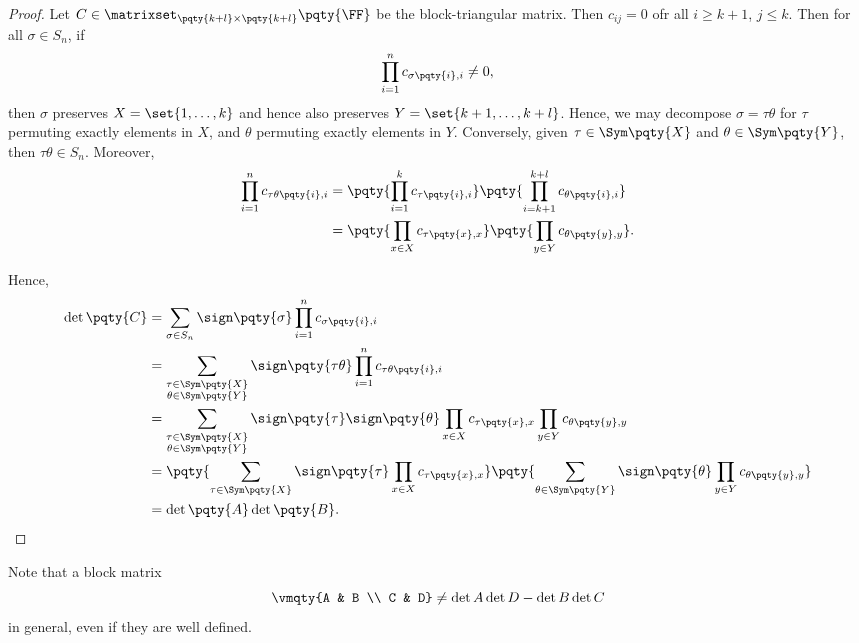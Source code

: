 \begin{proof}
    Let \(C \in \matrixset_{\pqty{k + l} \times \pqty{k + l}} \pqty{\FF}\) be the block-triangular matrix. Then \(c_{ij} = 0\) ofr all \(i \geq k + 1\), \(j \leq k\). Then for all \(\sigma \in S_n\), if
    \[
        \prod_{i = 1}^{n} c_{\sigma\pqty{i}, i} \neq 0,
    \]
    then \(\sigma\) preserves \(X = \set{1, \ldots, k}\) and hence also preserves \(Y = \set{k + 1, \ldots, k + l}\). Hence, we may decompose \(\sigma = \tau \theta\) for \(\tau\) permuting exactly elements in \(X\), and \(\theta\) permuting exactly elements in \(Y\). Conversely, given \(\tau \in \Sym\pqty{X}\) and \(\theta \in \Sym\pqty{Y}\), then \(\tau \theta \in S_n\). Moreover,
    \begin{align*}
        \prod_{i = 1}^{n} c_{\tau \theta\pqty{i}, i} &= \pqty{\prod_{i = 1}^{k} c_{\tau\pqty{i}, i}} \pqty{\prod_{i = k + 1}^{k + l} c_{\theta\pqty{i}, i}} \\
        &= \pqty{\prod_{x \in X} c_{\tau\pqty{x}, x}} \pqty{\prod_{y \in Y} c_{\theta\pqty{y}, y}}.
    \end{align*}

    Hence,
    \begin{align*}
        \det\pqty{C} &= \sum_{\sigma \in S_n} \sign\pqty{\sigma} \prod_{i = 1}^{n} c_{\sigma\pqty{i}, i} \\
        &= \sum_{\substack{\tau \in \Sym\pqty{X} \\ \theta \in \Sym\pqty{Y}}} \sign\pqty{\tau \theta} \prod_{i = 1}^{n} c_{\tau \theta\pqty{i}, i} \\
        &= \sum_{\substack{\tau \in \Sym\pqty{X} \\ \theta \in \Sym\pqty{Y}}} \sign\pqty{\tau} \sign\pqty{\theta} \prod_{x \in X} c_{\tau\pqty{x}, x} \prod_{y \in Y} c_{\theta\pqty{y}, y} \\
        &= \pqty{\sum_{\tau \in \Sym\pqty{X}} \sign\pqty{\tau} \prod_{x \in X} c_{\tau\pqty{x}, x}} \pqty{\sum_{\theta \in \Sym\pqty{Y}} \sign\pqty{\theta} \prod_{y \in Y} c_{\theta\pqty{y}, y}} \\
        &= \det\pqty{A} \det\pqty{B}.
    \end{align*}
\end{proof}

\begin{remark}
    Note that a block matrix
    \[
        \vmqty{A & B \\ C & D} \neq \det{A} \det{D} - \det{B} \det{C}
    \]
    in general, even if they are well defined.
\end{remark}

